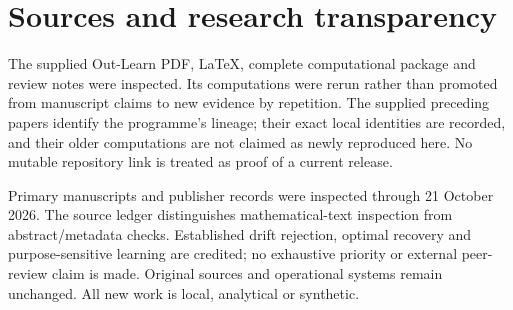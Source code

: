 \documentclass[11pt,letterpaper]{article}
\theoremstyle{definition}\newtheorem{definition}[theorem]{Definition}
\theoremstyle{remark}\newtheorem{remark}[theorem]{Remark}
\begin{document}
\section{Sources and research transparency}
The supplied Out-Learn PDF, LaTeX, complete computational package and review notes were inspected. Its computations were rerun rather than promoted from manuscript claims to new evidence by repetition. The supplied preceding papers identify the programme's lineage; their exact local identities are recorded, and their older computations are not claimed as newly reproduced here. No mutable repository link is treated as proof of a current release.

Primary manuscripts and publisher records were inspected through 21 October 2026. The source ledger distinguishes mathematical-text inspection from abstract/metadata checks. Established drift rejection, optimal recovery and purpose-sensitive learning are credited; no exhaustive priority or external peer-review claim is made. Original sources and operational systems remain unchanged. All new work is local, analytical or synthetic.
\end{document}
